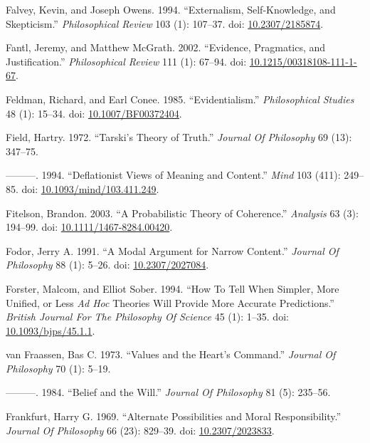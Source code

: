 \documentclass[
  10pt,
  letterpaper,
  DIV=11,
  numbers=noendperiod,
  twoside]{scrartcl}
\newlength{\cslhangindent}
\newenvironment{CSLReferences}[2] %
 {\begin{list}{}{%
  \setlength{\itemindent}{0pt}
  \setlength{\leftmargin}{0pt}
  \setlength{\parsep}{0pt}
  \ifodd #1
   \setlength{\leftmargin}{\cslhangindent}
   \setlength{\itemindent}{-1\cslhangindent}
  \fi
  \setlength{\itemsep}{#2\baselineskip}}}
 {\end{list}}
\begin{document}
\begin{CSLReferences}{1}{0}
Falvey, Kevin, and Joseph Owens. 1994. {``Externalism, Self-Knowledge,
and Skepticism.''} \emph{Philosophical Review} 103 (1): 107--37. doi:
\href{https://doi.org/10.2307/2185874}{10.2307/2185874}.

Fantl, Jeremy, and Matthew McGrath. 2002. {``Evidence, Pragmatics, and
Justification.''} \emph{Philosophical Review} 111 (1): 67--94. doi:
\href{https://doi.org/10.1215/00318108-111-1-67}{10.1215/00318108-111-1-67}.

Feldman, Richard, and Earl Conee. 1985. {``Evidentialism.''}
\emph{Philosophical Studies} 48 (1): 15--34. doi:
\href{https://doi.org/10.1007/BF00372404}{10.1007/BF00372404}.

Field, Hartry. 1972. {``Tarski's Theory of Truth.''} \emph{Journal Of
Philosophy} 69 (13): 347--75.

---------. 1994. {``Deflationist Views of Meaning and Content.''}
\emph{Mind} 103 (411): 249--85. doi:
\href{https://doi.org/10.1093/mind/103.411.249}{10.1093/mind/103.411.249}.

Fitelson, Brandon. 2003. {``A Probabilistic Theory of Coherence.''}
\emph{Analysis} 63 (3): 194--99. doi:
\href{https://doi.org/10.1111/1467-8284.00420}{10.1111/1467-8284.00420}.

Fodor, Jerry A. 1991. {``A Modal Argument for Narrow Content.''}
\emph{Journal Of Philosophy} 88 (1): 5--26. doi:
\href{https://doi.org/10.2307/2027084}{10.2307/2027084}.

Forster, Malcom, and Elliot Sober. 1994. {``How To Tell When Simpler,
More Unified, or Less \emph{Ad Hoc} Theories Will Provide More Accurate
Predictions.''} \emph{British Journal For The Philosophy Of Science} 45
(1): 1--35. doi:
\href{https://doi.org/10.1093/bjps/45.1.1}{10.1093/bjps/45.1.1}.

van Fraassen, Bas C. 1973. {``Values and the Heart's Command.''}
\emph{Journal Of Philosophy} 70 (1): 5--19.

---------. 1984. {``Belief and the Will.''} \emph{Journal Of Philosophy}
81 (5): 235--56.

Frankfurt, Harry G. 1969. {``Alternate Possibilities and Moral
Responsibility.''} \emph{Journal Of Philosophy} 66 (23): 829--39. doi:
\href{https://doi.org/10.2307/2023833}{10.2307/2023833}.


\end{CSLReferences}
\end{document}
